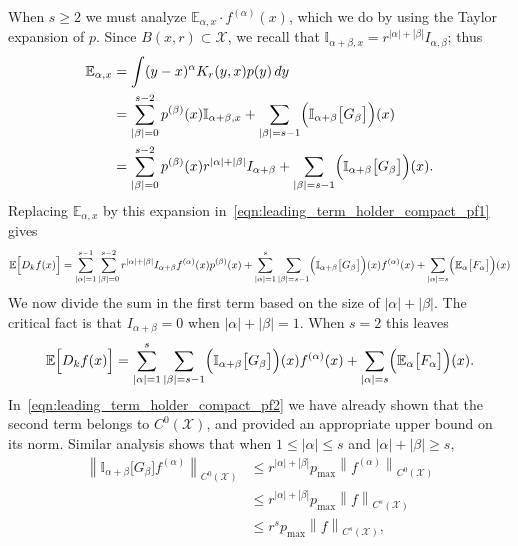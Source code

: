 \documentclass{article}
\newcommand{\abs}[1]{\left \lvert #1 \right \rvert}
\newcommand{\norm}[1]{\left \lVert #1 \right \rVert}
\newcommand{\1}{\mathbf{1}}
\newcommand{\Xset}{\mathcal{X}}
\newcommand{\Ebb}{\mathbb{E}}
\newcommand{\Ibb}{\mathbb{I}}
\theoremstyle{alden}
\theoremstyle{aldenthm}
\theoremstyle{definition}
\theoremstyle{remark}
\begin{document}
When $s \geq 2$ we must analyze $\Ebb_{\alpha,x} \cdot f^{(\alpha)}(x)$, which we do by using the Taylor expansion of $p$. Since $B(x,r) \subset \Xset$, we recall that $\Ibb_{\alpha + \beta,x} = r^{\abs{\alpha} + \abs{\beta}}I_{\alpha,\beta}$; thus
\begin{align*}
\Ebb_{\alpha,x} & = \int(y - x)^{\alpha} K_r(y,x) p(y) \,dy \\
& = \sum_{\abs{\beta} = 0}^{s - 2} p^{(\beta)}(x) \Ibb_{\alpha + \beta,x} + \sum_{\abs{\beta} = s - 1} \Bigl(\Ibb_{\alpha + \beta}\bigl[G_{\beta}\bigr]\Bigr)(x) \\
& = \sum_{\abs{\beta} = 0}^{s - 2} p^{(\beta)}(x) r^{\abs{\alpha} + \abs{\beta}} I_{\alpha + \beta} + \sum_{\abs{\beta} = s - 1} \Bigl(\Ibb_{\alpha + \beta}\bigl[G_{\beta}\bigr]\Bigr)(x).
\end{align*}
Replacing $\Ebb_{\alpha,x}$ by this expansion in~\eqref{eqn:leading_term_holder_compact_pf1} gives
\begin{equation*}
\Ebb\Bigl[D_kf(x)\Bigr] = \sum_{\abs{\alpha} = 1}^{s - 1} \sum_{\abs{\beta} = 0}^{s - 2} r^{\abs{\alpha} + \abs{\beta}} I_{\alpha + \beta} f^{(\alpha)}(x) p^{(\beta)}(x)  + \sum_{\abs{\alpha} = 1}^{s} \sum_{\abs{\beta} = s - 1} \Bigl(\Ibb_{\alpha + \beta}\bigl[G_{\beta}\bigr]\Bigr)(x) f^{(\alpha)}(x) + \sum_{\abs{\alpha} = s} \Bigl(\Ebb_{\alpha}\bigl[F_{\alpha}\bigr]\Bigr)(x)
\end{equation*}
We now divide the sum in the first term based on the size of $\abs{\alpha} + \abs{\beta}$. The critical fact is that $I_{\alpha + \beta} = 0$ when $\abs{\alpha} + \abs{\beta} = 1$. When $s = 2$ this leaves
\begin{equation*}
\Ebb\Bigl[D_kf(x)\Bigr] = \sum_{\abs{\alpha} = 1}^{s} \sum_{\abs{\beta} = s - 1} \Bigl(\Ibb_{\alpha + \beta}\bigl[G_{\beta}\bigr]\Bigr)(x) f^{(\alpha)}(x) + \sum_{\abs{\alpha} = s} \Bigl(\Ebb_{\alpha}\bigl[F_{\alpha}\bigr]\Bigr)(x).
\end{equation*}
In~\eqref{eqn:leading_term_holder_compact_pf2} we have already shown that the second term belongs to $C^{0}(\Xset)$, and provided an appropriate upper bound on its norm. Similar analysis shows that when $1 \leq \abs{\alpha} \leq s$ and $\abs{\alpha} + \abs{\beta} \geq s$,
\begin{align}
\norm{\Ibb_{\alpha + \beta}\bigl[G_{\beta}\bigr]f^{(\alpha)}}_{C^0(\Xset)} & \leq r^{\abs{\alpha} + \abs{\beta}} p_{\max} \norm{f^{(\alpha)}}_{C^0(\Xset)} \nonumber \\
& \leq r^{\abs{\alpha} + \abs{\beta}} p_{\max} \norm{f}_{C^s(\Xset)} \nonumber \\
& \leq r^s p_{\max} \norm{f}_{C^s(\Xset)}, \label{eqn:leading_term_holder_compact_pf5}
\end{align}
\end{document}
